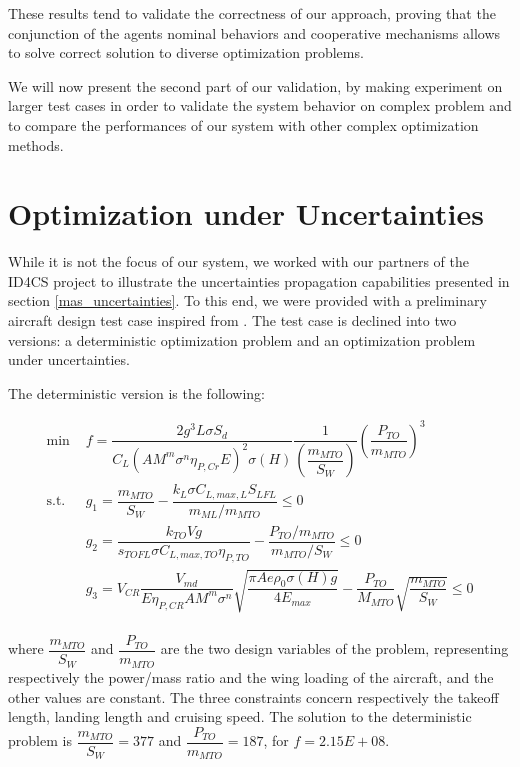These results tend to validate the correctness of our approach, proving that the conjunction of the agents nominal behaviors and cooperative mechanisms allows to solve correct solution to diverse optimization problems.

We will now present the second part of our validation, by making experiment on larger test cases in order to validate the system behavior on complex problem and to compare the performances of our system with other complex optimization methods.

\section{Optimization under Uncertainties}

While it is not the focus of our system, we worked with our partners of the ID4CS project to illustrate the uncertainties propagation capabilities presented in section \ref{mas_uncertainties}. To this end, we were provided with a preliminary aircraft design test case inspired from \cite{scholz2008preliminary}. The test case is declined into two versions: a deterministic optimization problem and an optimization problem under uncertainties.

The deterministic version is the following:

\begin{align*}
	\text{min }& f = \dfrac{2 g^3 L \sigma S_d}{C_L (A M^m {\sigma}^n \eta_{P,Cr} E)^2 \sigma (H)} \dfrac{1}{ \left( \dfrac{m_{MTO}}{S_W} \right) } \left(\dfrac{P_{TO}}{m_{MTO}}\right)^3  \\
	\text{s.t. } & g_1 = \dfrac{m_{MTO}}{S_W} - \dfrac{k_L \sigma C_{L, max, L} S_{LFL}}{ m_{ML}/m_{MTO}}\leq 0 \\
						&	g_2 = \dfrac{k_{TO} V g }{s_{TOFL} \sigma C_{L, max, TO} \eta_{P, TO}} - \dfrac{P_{TO}/m_{MTO}}{m_{MTO}/S_W} \leq 0\\
						&	g_3 = V_{CR}\dfrac{V_{md}}{E \eta_{P, CR} A M^m {\sigma}^n} \sqrt{\dfrac{\pi A e {\rho}_0 \sigma(H)g}{4 E_{max}}} - \dfrac{P_{TO}}{M_{MTO}} \sqrt{\dfrac{m_{MTO}}{S_W}} \leq 0\\
\end{align*}

where $\dfrac{m_{MTO}}{S_W}$ and $\dfrac{P_{TO}}{m_{MTO}}$ are the two design variables of the problem, representing respectively the power/mass ratio and the wing loading of the aircraft, and the other values are constant. The three constraints concern respectively the takeoff length, landing length and cruising speed. The solution to the deterministic problem is $\dfrac{m_{MTO}}{S_W} = 377$ and $\dfrac{P_{TO}}{m_{MTO}} = 187$, for $f = 2.15E+08$.

